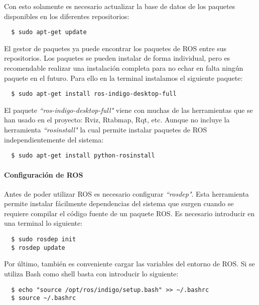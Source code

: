 Con esto solamente es necesario actualizar la base de datos de los paquetes
disponibles en los diferentes repositorios:
\\
\begin{lstlisting}
  $ sudo apt-get update
\end{lstlisting}

El gestor de paquetes ya puede encontrar los paquetes de ROS entre sus
repositorios. Los paquetes se pueden instalar de forma individual, pero es
recomendable realizar una instalación completa para no echar en falta ningún
paquete en el futuro. Para ello en la terminal instalamos el siguiente paquete:
\\
\begin{lstlisting}
  $ sudo apt-get install ros-indigo-desktop-full
\end{lstlisting}

El paquete \textit{``ros-indigo-desktop-full"} viene con muchas de las
herramientas que se han usado en el proyecto: Rviz, Rtabmap, Rqt, etc. Aunque no
incluye la herramienta \textit{``rosinstall"} la cual permite instalar paquetes
de ROS independientemente del sistema:
\\
\begin{lstlisting}
  $ sudo apt-get install python-rosinstall
\end{lstlisting}

\paragraph{Configuración de ROS} \hspace{0pt}

Antes de poder utilizar ROS es necesario configurar \textit{``rosdep"}. Esta
herramienta permite instalar fácilmente dependencias del sistema que surgen
cuando se requiere compilar el código fuente de un paquete ROS. Es necesario
introducir en una terminal lo siguiente:
\\
\begin{lstlisting}
  $ sudo rosdep init
  $ rosdep update
\end{lstlisting}

Por último, también es conveniente cargar las variables del entorno de ROS. Si
se utiliza Bash como shell basta con introducir lo siguiente:
\\
\begin{lstlisting}
  $ echo "source /opt/ros/indigo/setup.bash" >> ~/.bashrc
  $ source ~/.bashrc
\end{lstlisting}

